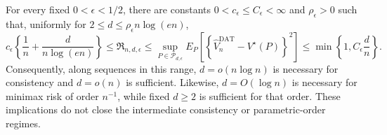 For every fixed \(0<\epsilon<1/2\), there are constants \(0<c_\epsilon\le C_\epsilon<\infty\) and \(\rho_\epsilon>0\) such that, uniformly for \(2\le d\le\rho_\epsilon n\log(en)\),
\[
 c_\epsilon\left\{\frac1n+\frac d{n\log(en)}\right\}
 \le\mathfrak R_{n,d,\epsilon}
 \le\sup_{P\in\mathcal P_{d,\epsilon}}
 E_P\!\left[
  \left\{\widehat V_n^{\mathrm{DAT}}-V^\star(P)\right\}^2
 \right]
 \le\min\!\left\{1,C_\epsilon\frac dn\right\}.
\]
Consequently, along sequences in this range, \(d=o(n\log n)\) is necessary for consistency and \(d=o(n)\) is sufficient.  Likewise, \(d=O(\log n)\) is necessary for minimax risk of order \(n^{-1}\), while fixed \(d\ge2\) is sufficient for that order.  These implications do not close the intermediate consistency or parametric-order regimes.